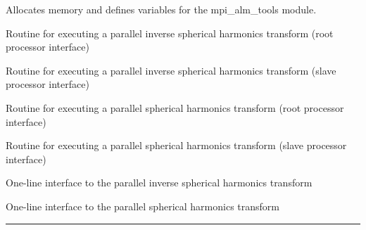 \begin{related}
  \begin{sulist}{} %
   \item[\htmlref{mpi\_initialize\_alm\_tools}{sub:mpi_initialize_alm_tools}] Allocates memory and defines variables for the mpi\_alm\_tools module. 
  \item[\htmlref{mpi\_alm2map}{sub:mpi_alm2map}] Routine for executing a parallel inverse spherical harmonics transform (root processor interface)
  \item[\htmlref{mpi\_alm2map\_slave}{sub:mpi_alm2map_slave}] Routine for executing a parallel inverse spherical harmonics transform (slave processor interface)
  \item[\htmlref{mpi\_map2alm}{sub:mpi_map2alm}] Routine for executing a parallel spherical harmonics transform (root processor interface)
  \item[\htmlref{mpi\_map2alm\_slave}{sub:mpi_map2alm_slave}] Routine for executing a parallel spherical harmonics transform (slave processor interface)
  \item[\htmlref{mpi\_alm2map\_simple}{sub:mpi_alm2map_simple}] One-line interface to the parallel inverse spherical harmonics transform 
  \item[\htmlref{mpi\_map2alm\_simple}{sub:mpi_map2alm_simple}] One-line interface to the parallel spherical harmonics transform 
  \end{sulist}
\end{related}

\rule{\hsize}{2mm}

\newpage
